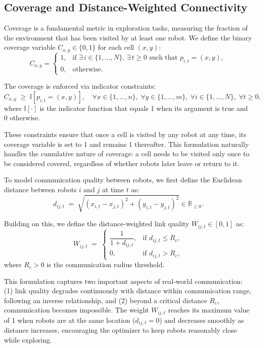 \subsection*{Coverage and Distance-Weighted Connectivity}

Coverage is a fundamental metric in exploration tasks, measuring the fraction of the environment that has been visited by at least one robot. We define the binary coverage variable $C_{x,y} \in \{0,1\}$ for each cell $(x,y)$:
\[
C_{x,y} =
\begin{cases}
1, & \text{if } \exists\, i \in \{1,\ldots,N\},\, \exists\, t \ge 0 \text{ such that } p_{i,t} = (x,y), \\
0, & \text{otherwise.}
\end{cases}
\]

The coverage is enforced via indicator constraints:
\[
C_{x,y} \;\ge\; \mathbb{I}\!\left[p_{i,t} = (x,y)\right], \quad \forall x \in \{1,\ldots,n\},\; \forall y \in \{1,\ldots,m\},\; \forall i \in \{1,\ldots,N\},\; \forall t \ge 0,
\]
where $\mathbb{I}[\cdot]$ is the indicator function that equals 1 when its argument is true and 0 otherwise.

These constraints ensure that once a cell is visited by any robot at any time, its coverage variable is set to 1 and remains 1 thereafter. This formulation naturally handles the cumulative nature of coverage: a cell needs to be visited only once to be considered covered, regardless of whether robots later leave or return to it.

To model communication quality between robots, we first define the Euclidean distance between robots $i$ and $j$ at time $t$ as:
\[
d_{ij,t} \;=\; \sqrt{(x_{i,t}-x_{j,t})^2 + (y_{i,t}-y_{j,t})^2} \in \mathbb{R}_{\ge 0}.
\]

Building on this, we define the distance-weighted link quality $W_{ij,t} \in [0,1]$ as:
\[
W_{ij,t} \;=\; 
\begin{cases}
\dfrac{1}{1+d_{ij,t}}, & \text{if } d_{ij,t} \le R_c, \\[6pt]
0, & \text{if } d_{ij,t} > R_c,
\end{cases}
\]
where $R_c > 0$ is the communication radius threshold.

This formulation captures two important aspects of real-world communication: (1) link quality degrades continuously with distance within communication range, following an inverse relationship, and (2) beyond a critical distance $R_c$, communication becomes impossible. The weight $W_{ij,t}$ reaches its maximum value of 1 when robots are at the same location ($d_{ij,t}=0$) and decreases smoothly as distance increases, encouraging the optimizer to keep robots reasonably close while exploring.

